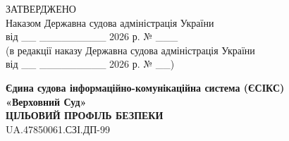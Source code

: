 \documentclass[10pt]{article}
\begin{document}
\begin{flushright}
ЗАТВЕРДЖЕНО\\
Наказом Державна судова адміністрація України\\
від \_\_ \_\_\_\_\_\_\_\_\_ 2026 р. № \_\_\_\\
(в редакції наказу Державна судова адміністрація України\\
від \_\_ \_\_\_\_\_\_\_\_\_ 2026 р. № \_\_)
\end{flushright}

\vspace{2cm}

\begin{center}
\textbf{\Large Єдина судова інформаційно-комунікаційна система (ЄСІКС)}\\
\textbf{\Large «Верховний Суд»}\\
\vspace{1cm}
\textbf{\Large ЦІЛЬОВИЙ ПРОФІЛЬ БЕЗПЕКИ}\\
\vspace{0.5cm}
\large UA.47850061.СЗІ.ДП-99
\end{center}

\newpage
\end{document}
